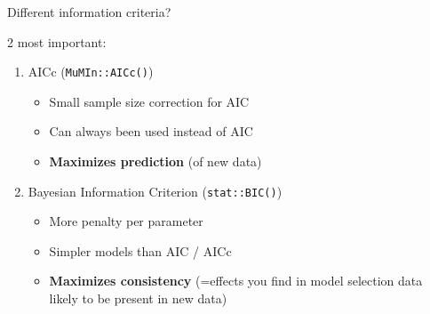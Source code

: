 \documentclass[12pt]{beamer}\usepackage[]{graphicx}\usepackage[]{color}
\begin{document}
\begin{frame}{Different information criteria?}
\begin{alertblock}{2 most important:}
\begin{enumerate}
  \item AICc (\texttt{MuMIn::AICc()})
    \begin{itemize} 
      \item Small sample size correction for AIC
      \item Can always been used instead of AIC
      \item \textbf{Maximizes prediction} (of new data)
    \end{itemize}
    \pause
  \item Bayesian Information Criterion (\texttt{stat::BIC()})
    \begin{itemize}
      \item More penalty per parameter 
      \item Simpler models than AIC / AICc
      \item \textbf{Maximizes consistency} (=effects you find in model selection data likely to be present in new data)
    \end{itemize}
\end{enumerate}
\end{alertblock}

\end{frame}
\end{document}
